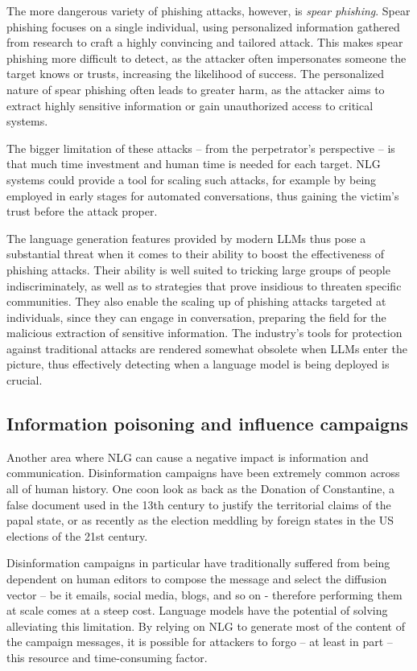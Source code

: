 The more dangerous variety of phishing attacks, however, is \emph{spear phishing}. Spear phishing focuses on a single individual, using personalized information gathered from research to craft a highly convincing and tailored attack.
This makes spear phishing more difficult to detect, as the attacker often impersonates someone the target knows or trusts, increasing the likelihood of success.
The personalized nature of spear phishing often leads to greater harm, as the attacker aims to extract highly sensitive information or gain unauthorized access to critical systems.

The bigger limitation of these attacks -- from the perpetrator's perspective -- is that much time investment and human time is needed for each target.
NLG systems could provide a tool for scaling such attacks, for example by being employed in early stages for automated conversations, thus gaining the victim's trust before the attack proper.

The language generation features provided by modern LLMs thus pose a substantial threat when it comes to their ability to boost the effectiveness of phishing attacks.
Their ability is well suited to tricking large groups of people indiscriminately, as well as to strategies that prove insidious to threaten specific communities.
They also enable the scaling up of phishing attacks targeted at individuals, since they can engage in conversation, preparing the field for the malicious extraction of sensitive information.
The industry's tools for protection against traditional attacks are rendered somewhat obsolete when LLMs enter the picture, thus effectively detecting when a language model is being deployed is crucial.

\subsection{Information poisoning and influence campaigns}

Another area where NLG can cause a negative impact is information and communication. Disinformation campaigns have been extremely common across all of human history.
One coon look as back as the Donation of Constantine, a false document used in the 13th century to justify the territorial claims of the papal state, or as recently as the election meddling by foreign states in the US elections of the 21st century.

Disinformation campaigns in particular have traditionally suffered from being dependent on human editors to compose the message and select the diffusion vector -- be it emails, social media, blogs, and so on - therefore performing them at scale comes at a steep cost. Language models have the potential of solving alleviating this limitation.
By relying on NLG to generate most of the content of the campaign messages, it is possible for attackers to forgo -- at least in part -- this resource and time-consuming factor.


